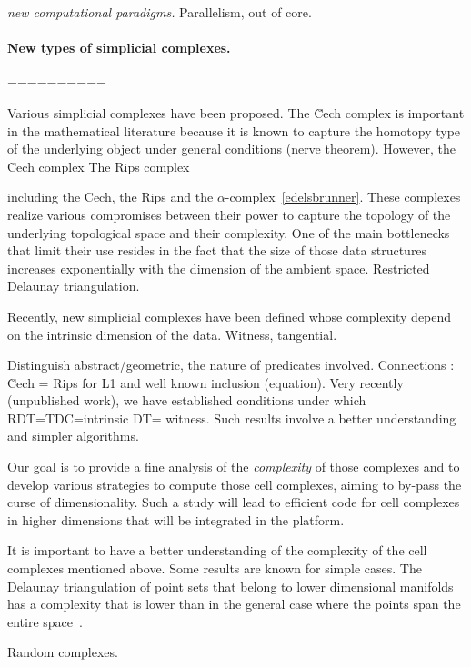 {\em new computational paradigms.} Parallelism, out of core.


\paragraph{New types of simplicial complexes.}





==========


Various simplicial complexes have been proposed. The \u{C}ech complex is important in the mathematical literature  because it is known to capture the homotopy type of the underlying object under general conditions (nerve theorem). However, the \u{C}ech complex The Rips complex 


including the Cech, the Rips and the $\alpha$-complex~\ref{edelsbrunner}. These complexes realize various compromises between their power to capture the topology of the underlying topological space and their complexity. One of the main bottlenecks that limit their use resides in the fact that the size of those data structures increases exponentially with the dimension of the ambient space. Restricted Delaunay triangulation.

Recently, new simplicial complexes have been defined whose complexity depend on the intrinsic dimension of the data. Witness, tangential. 

Distinguish abstract/geometric, the nature of predicates involved. Connections : \u{C}ech = Rips for L1 and well known inclusion (equation). Very recently (unpublished work), we have established conditions under which RDT=TDC=intrinsic DT= witness.
Such results involve a better understanding and simpler algorithms.

Our goal is to provide a fine analysis of the {\em complexity} of those complexes and to develop various strategies to compute those cell complexes, aiming to by-pass the curse of dimensionality. Such a study will lead to efficient code for cell complexes in higher dimensions that will be integrated in the platform.

It is important to have a better understanding of the complexity of the cell complexes mentioned above. Some results are known for simple cases. The Delaunay triangulation of point sets that belong to lower dimensional manifolds  has a complexity that is lower than in the general case where the points span the entire space~\cite{}. 

Random complexes.

